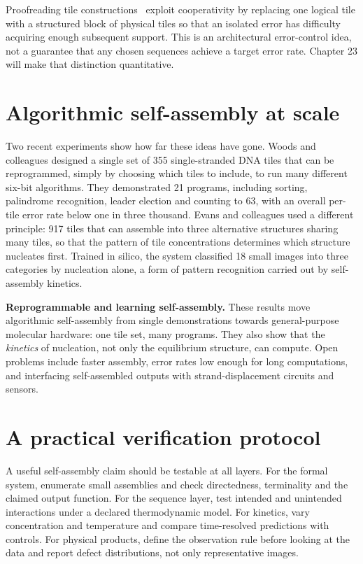 Proofreading tile constructions~\cite{WinfreeBekbolatov2004} exploit cooperativity by replacing one logical
tile with a structured block of physical tiles so that an isolated error has
difficulty acquiring enough subsequent support. This is an architectural
error-control idea, not a guarantee that any chosen sequences achieve a target
error rate. Chapter 23 will make that distinction quantitative.

\section{Algorithmic self-assembly at scale}
Two recent experiments show how far these ideas have gone. Woods and colleagues
designed a single set of 355 single-stranded DNA tiles that can be
reprogrammed, simply by choosing which tiles to include, to run many different
six-bit algorithms. They demonstrated 21 programs, including sorting,
palindrome recognition, leader election and counting to 63, with an overall
per-tile error rate below one in three thousand.\cite{Woods2019} Evans and
colleagues used a different principle: 917 tiles that can assemble into three
alternative structures sharing many tiles, so that the pattern of tile
concentrations determines which structure nucleates first. Trained in silico,
the system classified 18 small images into three categories by nucleation
alone, a form of pattern recognition carried out by self-assembly
kinetics.\cite{Evans2024}

\begin{Frontier}
\textbf{Reprogrammable and learning self-assembly.} These results move
algorithmic self-assembly from single demonstrations towards general-purpose
molecular hardware: one tile set, many programs.\cite{Woods2019} They also show
that the \emph{kinetics} of nucleation, not only the equilibrium structure, can
compute.\cite{Evans2024} Open problems include faster assembly, error rates low
enough for long computations, and interfacing self-assembled outputs with
strand-displacement circuits and sensors.
\end{Frontier}

\section{A practical verification protocol}

A useful self-assembly claim should be testable at all layers. For the formal
system, enumerate small assemblies and check directedness, terminality and the
claimed output function. For the sequence layer, test intended and unintended
interactions under a declared thermodynamic model. For kinetics, vary
concentration and temperature and compare time-resolved predictions with
controls. For physical products, define the observation rule before looking at
the data and report defect distributions, not only representative images.

